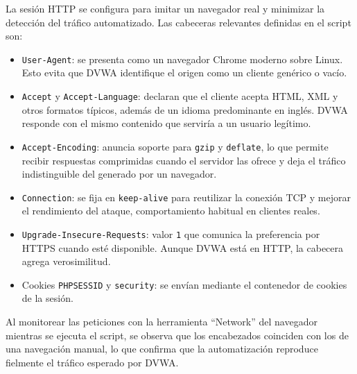 \documentclass[letterpaper,12pt]{article}
\begin{document}
La sesión HTTP se configura para imitar un navegador real y minimizar la detección del tráfico automatizado. Las cabeceras relevantes definidas en el script son:
\begin{itemize}
    \item \verb|User-Agent|: se presenta como un navegador Chrome moderno sobre Linux. Esto evita que DVWA identifique el origen como un cliente genérico o vacío.
    \item \verb|Accept| y \verb|Accept-Language|: declaran que el cliente acepta HTML, XML y otros formatos típicos, además de un idioma predominante en inglés. DVWA responde con el mismo contenido que serviría a un usuario legítimo.
    \item \verb|Accept-Encoding|: anuncia soporte para \verb|gzip| y \verb|deflate|, lo que permite recibir respuestas comprimidas cuando el servidor las ofrece y deja el tráfico indistinguible del generado por un navegador.
    \item \verb|Connection|: se fija en \verb|keep-alive| para reutilizar la conexión TCP y mejorar el rendimiento del ataque, comportamiento habitual en clientes reales.
    \item \verb|Upgrade-Insecure-Requests|: valor \verb|1| que comunica la preferencia por HTTPS cuando esté disponible. Aunque DVWA está en HTTP, la cabecera agrega verosimilitud.
    \item Cookies \verb|PHPSESSID| y \verb|security|: se envían mediante el contenedor de cookies de la sesión.
\end{itemize}

Al monitorear las peticiones con la herramienta ``Network'' del navegador mientras se ejecuta el script, se observa que los encabezados coinciden con los de una navegación manual, lo que confirma que la automatización reproduce fielmente el tráfico esperado por DVWA.
\end{document}
